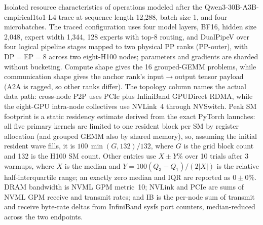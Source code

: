 \begin{table}[t]
  \caption{Isolated resource characteristics of operations modeled after the Qwen3-30B-A3B-empirical1to1-L4 trace at sequence length 12,288, batch size 1, and four microbatches. The traced configuration uses four model layers, BF16, hidden size 2,048, expert width 1,344, 128 experts with top-8 routing, and DualPipeV over four logical pipeline stages mapped to two physical PP ranks (PP-outer), with DP$=$EP$=$8 across two eight-H100 nodes; parameters and gradients are sharded without bucketing. Compute shape gives the 16 grouped-GEMM problems, while communication shape gives the anchor rank's input$\rightarrow$output tensor payload (A2A is ragged, so other ranks differ). The topology column names the actual data path: cross-node P2P uses PCIe plus InfiniBand GPUDirect RDMA, while the eight-GPU intra-node collectives use NVLink~4 through NVSwitch. Peak SM footprint is a static residency estimate derived from the exact PyTorch launches: all five primary kernels are limited to one resident block per SM by register allocation (and grouped GEMM also by shared memory), so, assuming the initial resident wave fills, it is $100\,\min(G,132)/132$, where $G$ is the grid block count and 132 is the H100 SM count. Other entries use $X\mathbin{\pm}Y\%$ over 10 trials after 3 warmups, where $X$ is the median and $Y=100(Q_3-Q_1)/(2|X|)$ is the relative half-interquartile range; an exactly zero median and IQR are reported as $0\mathbin{\pm}0\%$. DRAM bandwidth is NVML GPM metric~10; NVLink and PCIe are sums of NVML GPM receive and transmit rates; and IB is the per-node sum of transmit and receive byte-rate deltas from InfiniBand sysfs port counters, median-reduced across the two endpoints.}
  \label{tab:figure1-isolated-resource-characteristics}
\end{table}
